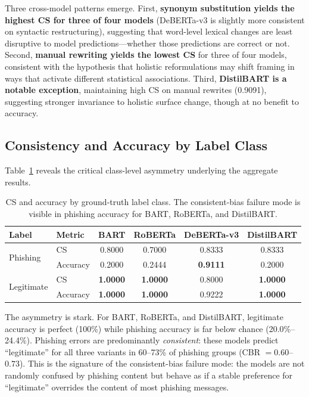 \documentclass[11pt]{article}
\begin{document}
Three cross-model patterns emerge. First, \textbf{synonym substitution yields the highest CS for three of four models} (DeBERTa-v3 is slightly more consistent on syntactic restructuring), suggesting that word-level lexical changes are least disruptive to model predictions---whether those predictions are correct or not. Second, \textbf{manual rewriting yields the lowest CS} for three of four models, consistent with the hypothesis that holistic reformulations may shift framing in ways that activate different statistical associations. Third, \textbf{DistilBART is a notable exception}, maintaining high CS on manual rewrites (0.9091), suggesting stronger invariance to holistic surface change, though at no benefit to accuracy.

\subsection{Consistency and Accuracy by Label Class}
\label{sec:by_class}

Table~\ref{tab:label} reveals the critical class-level asymmetry underlying the aggregate results.

\begin{table}[h]
\centering
\small
\caption{CS and accuracy by ground-truth label class. The consistent-bias failure mode is visible in phishing accuracy for BART, RoBERTa, and DistilBART.}
\label{tab:label}
\setlength{\tabcolsep}{8pt}
\begin{tabular}{llcccc}
\toprule
\textbf{Label} & \textbf{Metric} & \textbf{BART} & \textbf{RoBERTa} & \textbf{DeBERTa-v3} & \textbf{DistilBART} \\
\midrule
\multirow{2}{*}{Phishing}
  & CS       & 0.8000 & 0.7000 & 0.8333 & 0.8333 \\
  & Accuracy & 0.2000 & 0.2444 & \textbf{0.9111} & 0.2000 \\
\midrule
\multirow{2}{*}{Legitimate}
  & CS       & \textbf{1.0000} & \textbf{1.0000} & 0.8000 & \textbf{1.0000} \\
  & Accuracy & \textbf{1.0000} & \textbf{1.0000} & 0.9222 & \textbf{1.0000} \\
\bottomrule
\end{tabular}
\end{table}

The asymmetry is stark. For BART, RoBERTa, and DistilBART, legitimate accuracy is perfect (100\%) while phishing accuracy is far below chance (20.0\%--24.4\%). Phishing errors are predominantly \textit{consistent}: these models predict ``legitimate'' for all three variants in 60--73\% of phishing groups (CBR $= 0.60$--$0.73$). This is the signature of the consistent-bias failure mode: the models are not randomly confused by phishing content but behave as if a stable preference for ``legitimate'' overrides the content of most phishing messages.
\end{document}
